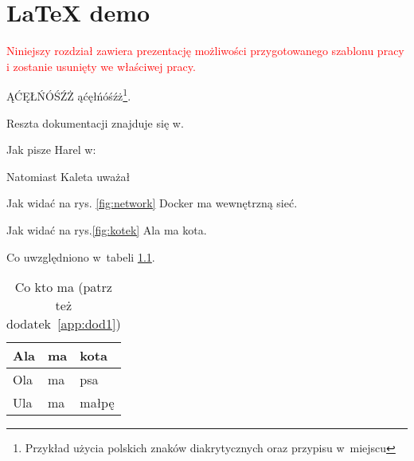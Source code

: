 
\chapter{LaTeX demo}

\textcolor{red}{
    Niniejszy rozdział zawiera prezentację możliwości przygotowanego szablonu pracy
    i zostanie usunięty we właściwej pracy.
}

ĄĆĘŁŃÓŚŹŻ ąćęłńóśźż\footnote{Przykład użycia polskich znaków diakrytycznych oraz przypisu w~miejscu}.

Reszta dokumentacji znajduje się w.

Jak pisze Harel w: \lipsum[1]

Natomiast Kaleta uważał \lipsum[1]

Jak widać na rys. \ref{fig:network} Docker ma wewnętrzną sieć.


Jak widać na rys.\ref{fig:kotek} Ala ma kota. \lipsum[1]


Co uwzględniono w~tabeli \ref{tabela:coktoma}. \lipsum[1]

\noindent\begin{minipage}{\textwidth}
    \begin{table}[H]
        \raggedright\caption{Co kto ma (patrz też dodatek~\ref{app:dod1}) \label{tabela:coktoma}}
        \begin{center}\begin{tabular}{|l|l|l|}%
                          \hline
                          Ala & ma & kota \\
                          \hline
                          Ola & ma & psa \\
                          \hline
                          Ula & ma & małpę\\
                          \hline
        \end{tabular}\end{center}
        \raggedright{}
        \vspace{0.75cm}
    \end{table}
\end{minipage}

